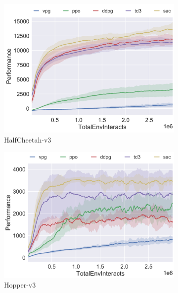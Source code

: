 \documentclass[12pt,twoside]{report}
\begin{document}
\begin{figure}[h]
     \centering
     \begin{subfigure}[b]{0.49\textwidth}
         \centering
         \includegraphics[width=\textwidth]{figures/OpenAI benchmarks/halfcheetah pt.png}
         \caption{HalfCheetah-v3}
     \end{subfigure}
     \hfill
     \begin{subfigure}[b]{0.49\textwidth}
         \centering
         \includegraphics[width=\textwidth]{figures/OpenAI benchmarks/hopper pt.png}
         \caption{Hopper-v3}
     \end{subfigure}
     \hfill
     \begin{subfigure}[b]{0.49\textwidth}
         \centering

\end{subfigure}
\end{figure}
\end{document}
